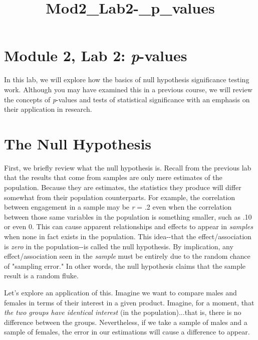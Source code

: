 \documentclass[11pt]{article}
\title{Mod2\_Lab2-\_p\_values}
\begin{document}
    
    
    \maketitle
    
    

    
    \section{\texorpdfstring{Module 2, Lab 2:
\emph{p}-values}{Module 2, Lab 2: p-values}}\label{module-2-lab-2-p-values}

In this lab, we will explore how the basics of null hypothesis
significance testing work. Although you may have examined this in a
previous course, we will review the concepts of \emph{p}-values and
tests of statistical significance with an emphasis on their application
in research.

\section{The Null Hypothesis}\label{the-null-hypothesis}

First, we briefly review what the null hypothesis is. Recall from the
previous lab that the results that come from samples are only mere
estimates of the population. Because they are estimates, the statistics
they produce will differ somewhat from their population counterparts.
For example, the correlation between engagement in a sample may be
\emph{r} = .2 even when the correlation between those same variables in
the population is something smaller, such as .10 or even 0. This can
cause apparent relationships and effects to appear in \emph{samples}
when none in fact exists in the population. This idea-\/-that the
effect/association is \emph{zero} in the population-\/-is called the
null hypothesis. By implication, any effect/association seen in the
\emph{sample} must be entirely due to the random chance of "sampling
error." In other words, the null hypothesis claims that the sample
result is a random fluke.

Let's explore an application of this. Imagine we want to compare males
and females in terms of their interest in a given product. Imagine, for
a moment, that \emph{the two groups have identical interest} (in the
population)...that is, there is no difference between the groups.
Nevertheless, if we take a sample of males and a sample of females, the
error in our estimations will cause a difference to appear.
\end{document}
